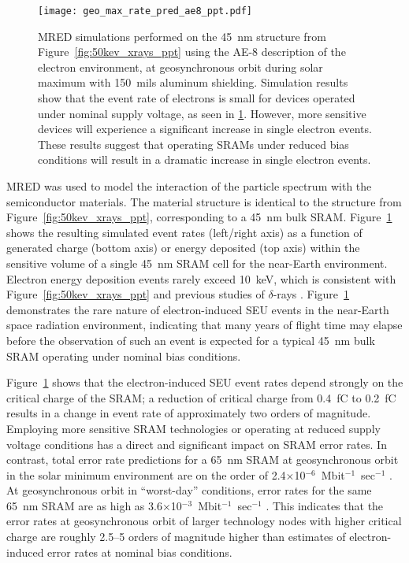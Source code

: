\begin{figure}[htbp]
    \begin{center}
        \texttt{[image: geo\_max\_rate\_pred\_ae8\_ppt.pdf]}
    \end{center}
    \caption{MRED simulations performed on the 45~nm structure from Figure~\ref{fig:50kev_xrays_ppt} using the AE-8 description of the electron environment, at geosynchronous orbit during solar maximum with 150~mils aluminum shielding. Simulation results show that the event rate of electrons is small for devices operated under nominal supply voltage, as seen in \ref{fig:geo_max_rate_pred_ae8_ppt}. However, more sensitive devices will experience a significant increase in single electron events. These results suggest that operating SRAMs under reduced bias conditions will result in a dramatic increase in single electron events.}
    \label{fig:geo_max_rate_pred_ae8_ppt}
\end{figure}

MRED was used to model the interaction of the particle spectrum with the semiconductor materials. 
The material structure is identical to the structure from Figure~\ref{fig:50kev_xrays_ppt}, corresponding to a 45~nm bulk SRAM.
Figure~\ref{fig:geo_max_rate_pred_ae8_ppt} shows the resulting simulated event rates (left/right axis) as a function of generated charge (bottom axis) or energy deposited (top axis) within the sensitive volume of a single 45~nm SRAM cell for the near-Earth environment. 
Electron energy deposition events rarely exceed 10~keV, which is consistent with Figure~\ref{fig:50kev_xrays_ppt} and previous studies of $\delta$-rays \cite{King:2010cu, King:2012cb}. 
Figure~\ref{fig:geo_max_rate_pred_ae8_ppt} demonstrates the rare nature of electron-induced SEU events in the near-Earth space radiation environment, indicating that many years of flight time may elapse before the observation of such an event is expected for a typical 45~nm bulk SRAM operating under nominal bias conditions.  

Figure~\ref{fig:geo_max_rate_pred_ae8_ppt} shows that the electron-induced SEU event rates depend strongly on the critical charge of the SRAM; a reduction of critical charge from 0.4~fC to 0.2~fC results in a change in event rate of approximately two orders of magnitude. 
Employing more sensitive SRAM technologies or operating at reduced supply voltage conditions has a direct and significant impact on SRAM error rates. 
In contrast, total error rate predictions for a 65~nm SRAM at geosynchronous orbit in the solar minimum environment are on the order of 2.4$\times$10$^{-6}$~Mbit$^{-1}$~sec$^{-1}$ \cite{Sierawski:2009ka}.
At geosynchronous orbit in ``worst-day'' conditions, error rates for the same 65~nm SRAM are as high as 3.6$\times$10$^{-3}$~Mbit$^{-1}$~sec$^{-1}$ \cite{Sierawski:2009ka}.
This indicates that the error rates at geosynchronous orbit of larger technology nodes with higher critical charge are roughly 2.5--5 orders of magnitude higher than estimates of electron-induced error rates at nominal bias conditions.

